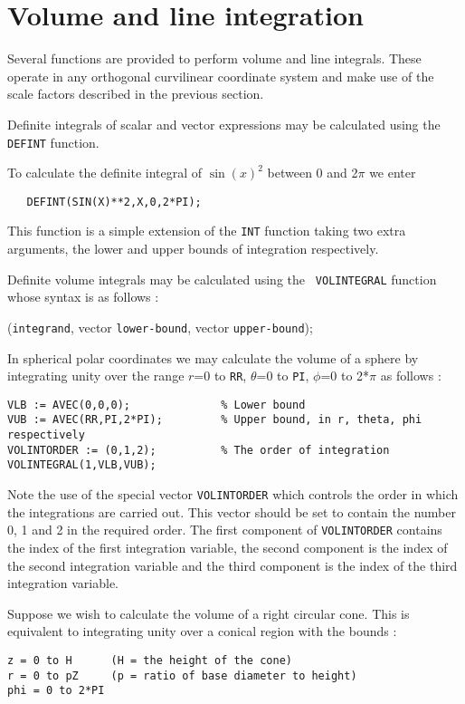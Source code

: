 \section{Volume and line integration}

Several functions are provided to perform volume and line integrals.
These operate in any orthogonal curvilinear coordinate system and
make use of the scale factors described in the previous section.

Definite integrals of scalar and vector expressions may be calculated
using the {\tt DEFINT} function.


\noindent To calculate the definite integral of $\sin(x)^2$ between 0 and 2$\pi$
we enter
\begin{verbatim}
   DEFINT(SIN(X)**2,X,0,2*PI);
\end{verbatim}
This function is a simple extension of the {\tt INT} function taking
two extra arguments, the lower and upper bounds of integration
respectively.


Definite volume integrals may be calculated using the {\tt
VOLINTEGRAL} function whose syntax is as follows :

({\tt integrand}, vector {\tt lower-bound},
vector {\tt upper-bound});


\noindent In spherical polar coordinates we may calculate the volume of a sphere
by integrating unity over the range $r$=0 to {\tt RR}, $\theta$=0 to
{\tt PI}, $\phi$=0 to 2*$\pi$ as follows :
\begin{verbatim}
VLB := AVEC(0,0,0);              % Lower bound
VUB := AVEC(RR,PI,2*PI);         % Upper bound, in r, theta, phi respectively
VOLINTORDER := (0,1,2);          % The order of integration
VOLINTEGRAL(1,VLB,VUB);
\end{verbatim}
Note the use of the special vector {\tt VOLINTORDER} which controls
the order in which the integrations are carried out. This vector
should be set to contain the number 0, 1 and 2 in the required order.
The first component of {\tt VOLINTORDER} contains the index of the
first integration variable, the second component is the index of the
second integration variable and the third component is the index of
the third integration variable.


\noindent Suppose we wish to calculate the volume of a right circular cone. This
is equivalent to integrating unity over a conical region with the
bounds :
\begin{verbatim}
z = 0 to H      (H = the height of the cone)
r = 0 to pZ     (p = ratio of base diameter to height)
phi = 0 to 2*PI
\end{verbatim}

